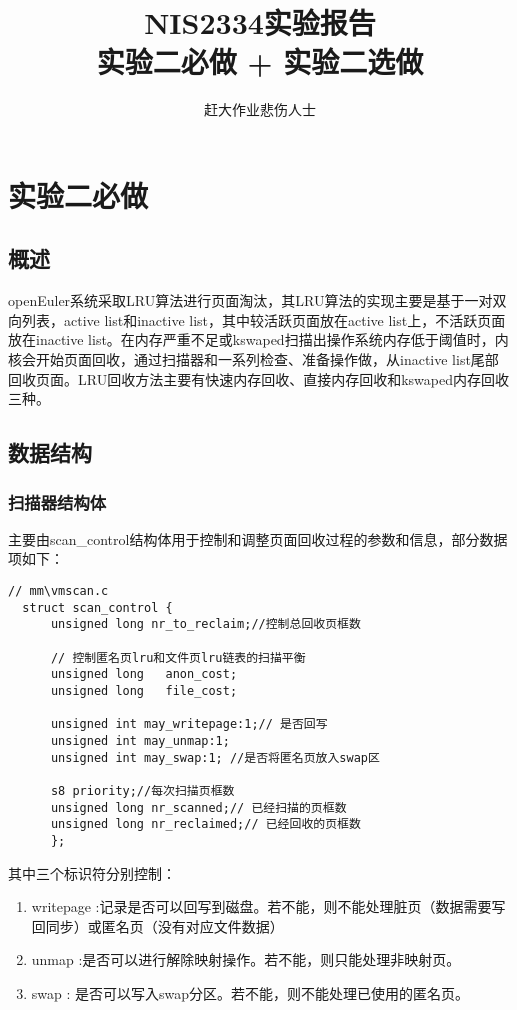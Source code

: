 \documentclass[11pt, a4paper, oneside,UTF8]{ctexart}
\title{\textbf{NIS2334实验报告}\\ \large \textbf{实验二必做 + 实验二选做}}
\author{赶大作业悲伤人士}
\date{}%
\begin{document}
\setcounter{page}{1}

\maketitle
\vspace{-\baselineskip}
\thispagestyle{fancy}

\section{\textbf{实验二必做}}

\subsection{概述}
openEuler系统采取LRU算法进行页面淘汰，其LRU算法的实现主要是基于一对双向列表，active list和inactive list，其中较活跃页面放在active list上，不活跃页面放在inactive list。在内存严重不足或kswaped扫描出操作系统内存低于阈值时，内核会开始页面回收，通过扫描器和一系列检查、准备操作做，从inactive list尾部回收页面。LRU回收方法主要有快速内存回收、直接内存回收和kswaped内存回收三种。

\subsection{数据结构}
\subsubsection{扫描器结构体}
主要由scan\_control结构体用于控制和调整页面回收过程的参数和信息，部分数据项如下：
\begin{lstlisting}
// mm\vmscan.c
  struct scan_control {
      unsigned long nr_to_reclaim;//控制总回收页框数

      // 控制匿名页lru和文件页lru链表的扫描平衡
      unsigned long   anon_cost;
      unsigned long   file_cost;

      unsigned int may_writepage:1;// 是否回写
      unsigned int may_unmap:1;
      unsigned int may_swap:1; //是否将匿名页放入swap区

      s8 priority;//每次扫描页框数  
      unsigned long nr_scanned;// 已经扫描的页框数
      unsigned long nr_reclaimed;// 已经回收的页框数
      };
\end{lstlisting}
其中三个标识符分别控制：
\begin{enumerate}
    \setlength{\itemsep}{-0.5em}
    \item writepage :记录是否可以回写到磁盘。若不能，则不能处理脏页（数据需要写回同步）或匿名页（没有对应文件数据）
    \item unmap :是否可以进行解除映射操作。若不能，则只能处理非映射页。
    \item swap : 是否可以写入swap分区。若不能，则不能处理已使用的匿名页。
\end{enumerate}
\end{document}
